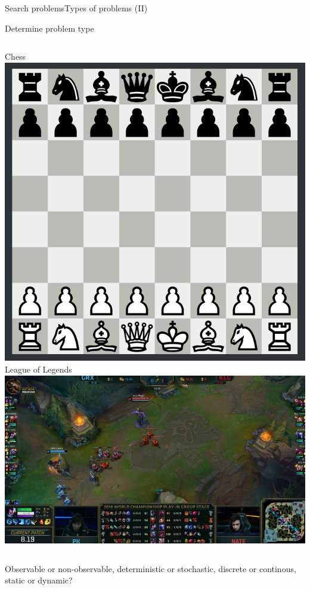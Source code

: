 \documentclass[10pt,compress]{beamer} %
\begin{document}
\begin{frame}[fragile]{Search problems}{Types of problems (II)}
    \begin{exampleblock}{Determine problem type}
       \begin{columns}
           \centering Chess\\
           \medskip
	        \includegraphics[width=0.75\linewidth]{figs/chess.png}\\

           \centering League of Legends\\
           \medskip
	        \includegraphics[width=0.75\linewidth]{figs/lol.jpg}\\
        \end{columns}
        \medskip
        Observable or non-observable, deterministic or stochastic, discrete or continous, static or dynamic?
    \end{exampleblock}
\end{frame}
\end{document}

